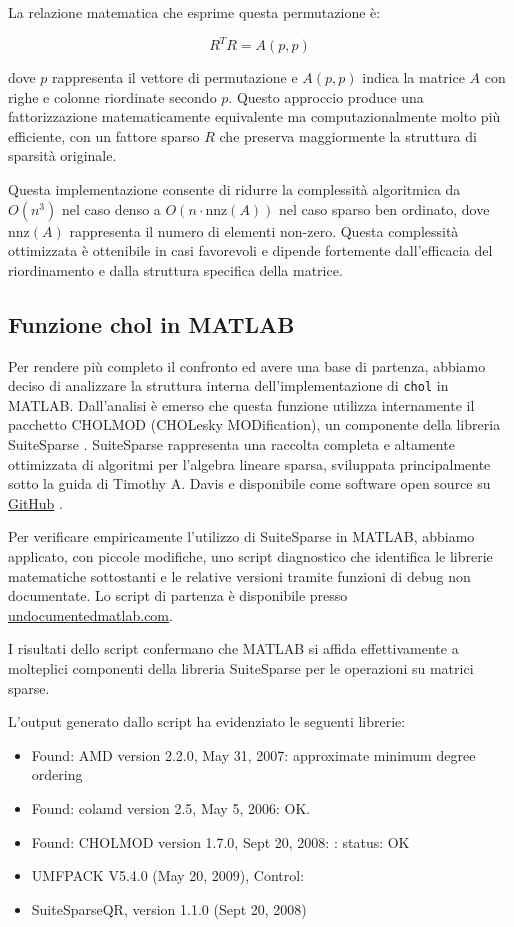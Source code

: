 La relazione matematica che esprime questa permutazione è:

\[ R^TR = A(p,p) \]

dove $p$ rappresenta il vettore di permutazione e $A(p,p)$ indica la matrice $A$ con righe e colonne riordinate secondo $p$. 
Questo approccio produce una fattorizzazione matematicamente equivalente ma computazionalmente molto più efficiente, 
con un fattore sparso $R$ che preserva maggiormente la struttura di sparsità originale.

Questa implementazione consente di ridurre la complessità algoritmica da $O(n^3)$ nel caso denso a $O(n \cdot \text{nnz}(A))$ 
nel caso sparso ben ordinato, dove $\text{nnz}(A)$ rappresenta il numero di elementi non-zero. Questa complessità ottimizzata 
è ottenibile in casi favorevoli e dipende fortemente dall'efficacia del riordinamento e dalla struttura specifica della matrice.

\subsection{Funzione chol in MATLAB}

Per rendere più completo il confronto ed avere una base di partenza, abbiamo deciso di analizzare 
la struttura interna dell'implementazione di \texttt{chol} in MATLAB. 
Dall'analisi è emerso che questa funzione utilizza internamente il pacchetto CHOLMOD (CHOLesky MODification), 
un componente della libreria SuiteSparse \cite{SuiteSparse}. SuiteSparse rappresenta una raccolta completa e 
altamente ottimizzata di algoritmi per l'algebra lineare sparsa, sviluppata principalmente sotto la guida 
di Timothy A. Davis e disponibile come software open source su \href{https://github.com/DrTimothyAldenDavis/SuiteSparse}{GitHub} \cite{SuiteSparse}.

Per verificare empiricamente l'utilizzo di SuiteSparse in MATLAB, abbiamo applicato, con piccole modifiche, uno script diagnostico 
che identifica le librerie matematiche sottostanti e le relative versioni tramite funzioni di debug non documentate.
Lo script di partenza è disponibile presso \href{https://undocumentedmatlab.com/articles/sparse-data-math-info}{undocumentedmatlab.com}.

I risultati dello script confermano che MATLAB si affida effettivamente a molteplici componenti della libreria SuiteSparse 
per le operazioni su matrici sparse.

L'output generato dallo script ha evidenziato le seguenti librerie:
\begin{itemize}
    \item Found: AMD version 2.2.0, May 31, 2007: approximate minimum degree ordering
    \item Found: colamd version 2.5, May 5, 2006: OK.
    \item Found: CHOLMOD version 1.7.0, Sept 20, 2008:  : status: OK
    \item UMFPACK V5.4.0 (May 20, 2009), Control:
    \item SuiteSparseQR, version 1.1.0 (Sept 20, 2008)
\end{itemize}

